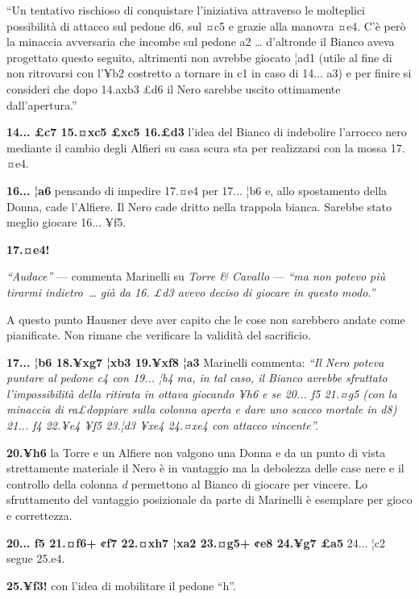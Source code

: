 ``Un tentativo rischioso di conquistare l'iniziativa attraverso le
molteplici possibilità di attacco sul pedone d6, sul ¤c5 e grazie alla
manovra ¤e4. C'è però la minaccia avversaria che incombe sul pedone a2
\ldots{} d'altronde il Bianco aveva progettato questo seguito,
altrimenti non avrebbe giocato ¦ad1 (utile al fine di non ritrovarsi con
l'¥b2 costretto a tornare in c1 in caso di 14... a3) e per finire si
consideri che dopo 14.axb3 £d6 il Nero sarebbe uscito ottimamente
dall'apertura.''

\textbf{14... £c7 15.¤xc5 £xc5 16.£d3} l'idea del Bianco di indebolire
l'arrocco nero mediante il cambio degli Alfieri su casa scura sta per
realizzarsi con la mossa 17.¤e4.

\textbf{16... ¦a6} pensando di impedire 17.¤e4 per 17... ¦b6 e, allo
spostamento della Donna, cade l'Alfiere. Il Nero cade dritto nella
trappola bianca. Sarebbe stato meglio giocare 16... ¥f5.

\textbf{17.¤e4!}


\emph{``Audace''} --- commenta Marinelli su \emph{Torre \& Cavallo} ---
\emph{``ma non potevo più tirarmi indietro~\ldots{} già da 16. £d3 avevo
deciso di giocare in questo modo.''}

A questo punto Hausner deve aver capito che le cose non sarebbero andate
come pianificate. Non rimane che verificare la validità del sacrificio.

\textbf{17... ¦b6 18.¥xg7 ¦xb3 19.¥xf8 ¦a3} Marinelli commenta:
\emph{``Il Nero poteva puntare al pedone c4 con 19... ¦b4 ma, in tal
caso, il Bianco avrebbe sfruttato l'impossibilità della ritirata in
ottava giocando ¥h6 e se 20... f5 21.¤g5 (con la minaccia di ra£doppiare
sulla colonna aperta e dare uno scacco mortale in d8) 21... f4 22.¥e4
¥f5 23.¦d3 ¥xe4 24.¤xe4 con attacco vincente''.}

\textbf{20.¥h6} la Torre e un Alfiere non valgono una Donna e da un
punto di vista strettamente materiale il Nero è in vantaggio ma la
debolezza delle case nere e il controllo della colonna \emph{d}
permettono al Bianco di giocare per vincere. Lo sfruttamento del
vantaggio posizionale da parte di Marinelli è esemplare per gioco e
correttezza.

\textbf{20... f5 21.¤f6+ ¢f7 22.¤xh7 ¦xa2 23.¤g5+ ¢e8 24.¥g7 £a5} 24...
¦c2 segue 25.e4.

\textbf{25.¥f3!} con l'idea di mobilitare il pedone ``h''.

